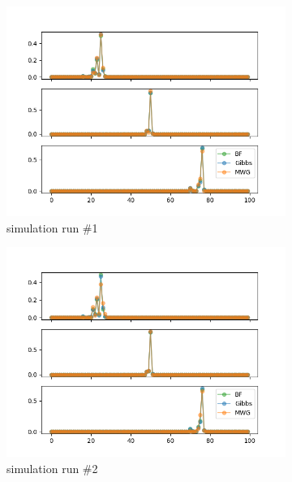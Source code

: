 \begin{figure}[H]
    \centering
    \begin{subfigure}{.3\textwidth}
    	\centering
        \includegraphics[width=\linewidth]{../../plots/Posterior_post_burnin_M4_N100_NMCMC3_seed0_diffind2.png}
        \caption{simulation run \#1}
    \end{subfigure}
    \begin{subfigure}{.3\textwidth}
        \centering
    	\includegraphics[width=\linewidth]{../../plots/Posterior_post_burnin_M4_N100_NMCMC3_seed1_diffind2.png}
    	\caption{simulation run \#2}
	\end{subfigure}
	\begin{subfigure}{.3\textwidth}

\end{subfigure}
\end{figure}
